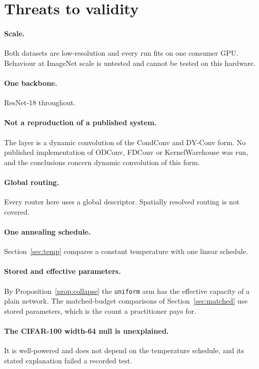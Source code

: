 \documentclass[10pt,a4paper]{article}
\begin{document}
\section{Threats to validity}

\paragraph{Scale.} Both datasets are low-resolution and every run fits on
one consumer GPU. Behaviour at ImageNet scale is untested and cannot be
tested on this hardware.

\paragraph{One backbone.} ResNet-18 throughout.

\paragraph{Not a reproduction of a published system.} The layer is a
dynamic convolution of the CondConv and DY-Conv form. No published
implementation of ODConv, FDConv or KernelWarehouse was run, and the
conclusions concern dynamic convolution of this form.

\paragraph{Global routing.} Every router here uses a global descriptor.
Spatially resolved routing is not covered.

\paragraph{One annealing schedule.} Section~\ref{sec:temp} compares a
constant temperature with one linear schedule.

\paragraph{Stored and effective parameters.} By
Proposition~\ref{prop:collapse} the \texttt{uniform} arm has the
effective capacity of a plain network. The matched-budget comparisons of
Section~\ref{sec:matched} use stored parameters, which is the count a
practitioner pays for.

\paragraph{The CIFAR-100 width-64 null is unexplained.} It is
well-powered and does not depend on the temperature schedule, and its
stated explanation failed a recorded test.
\end{document}

